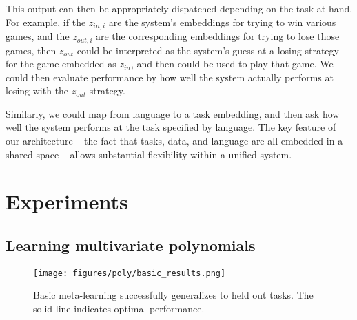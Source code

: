 \documentclass{article}
\begin{document}
This output can then be appropriately dispatched depending on the task at hand. For example, if the $z_{in,i}$ are the system's embeddings for trying to win various games, and the $z_{out,i}$ are the corresponding embeddings for trying to lose those games, then $z_{out}$ could be interpreted as the system's guess at a losing strategy for the game embedded as $z_{in}$, and then could be used to play that game. We could then evaluate performance by how well the system actually performs at losing with the $z_{out}$ strategy. \par
Similarly, we could map from language to a task embedding, and then ask how well the system performs at the task specified by language. The key feature of our architecture -- the fact that tasks, data, and language are all embedded in a shared space -- allows substantial flexibility within a unified system. 

\section{Experiments}
%
\subsection{Learning multivariate polynomials}
\begin{figure}
\centering
\texttt{[image: figures/poly/basic\_results.png]}
\caption{Basic meta-learning successfully generalizes to held out tasks. The solid line indicates optimal performance.}
\label{poly_basic_results}
\end{figure}
\end{document}
